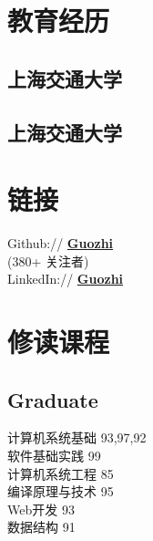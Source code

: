 \documentclass[]{deedy-resume-openfont}
\begin{document}
%
%
\lastupdated

%
%

%
%

\begin{minipage}[t]{0.25\textwidth} 


\section{教育经历} 
\sectionsep

\subsection{上海交通大学}
\sectionsep

\subsection{上海交通大学}
\sectionsep


\section{链接}
\sectionsep  
Github:// \href{https://github.com/Guozhi-explore}{\bf Guozhi} \\
(380+ 关注者) \\
LinkedIn://  \href{https://www.linkedin.com/in/zhi-guo-316892186}{\bf Guozhi} \\


\section{修读课程}
\subsection{Graduate}
 计算机系统基础  93,97,92 \\
 软件基础实践 99\\
 计算机系统工程 85 \\
 编译原理与技术 95 \\
 Web开发 93 \\
 数据结构 91 \\
 \sectionsep


\end{minipage}
\end{document}

